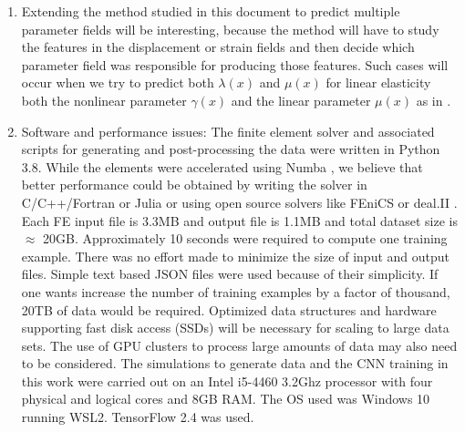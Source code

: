 \documentclass[12pt]{article}
\begin{document}
\begin{enumerate}
\item{Extending the method studied in this document to predict multiple parameter fields will be interesting, because the method will have to study the features in the displacement or strain fields and then decide which parameter field was responsible for producing those features. Such cases will occur when we try to predict both $\lambda(x)$ and $\mu(x)$ for linear elasticity both the nonlinear parameter $\gamma(x)$ and the linear parameter $\mu(x)$ as in \cite{paper:gokhale2008}}.
\item{Software and performance issues: The finite element solver and associated scripts for generating and post-processing the data were written in Python 3.8. While the elements were accelerated using Numba \cite{conf:numba}, we believe that better performance could be obtained by writing the solver in C/C++/Fortran or Julia or using open source solvers like FEniCS \cite{paper:fenics} or deal.II \cite{paper:deal.ii}. Each FE input file is 3.3MB and output file is 1.1MB and total dataset size is $\approx$  20GB. Approximately 10 seconds were required to compute one training example. There was no effort made to minimize the size of input and output files. Simple text based JSON files were used because of their simplicity. If one wants increase the number of training examples by a factor of thousand, 20TB of data would be required. Optimized data structures and hardware supporting fast disk access (SSDs) will be necessary for scaling to large data sets. The use of GPU clusters to process large amounts of data may also need to be considered. The simulations to generate data and the CNN training in this work were carried out on an Intel i5-4460 3.2Ghz processor with four physical and logical cores and 8GB RAM. The OS used was Windows 10 running WSL2. TensorFlow 2.4 was used.}
\end{enumerate}
\end{document}
